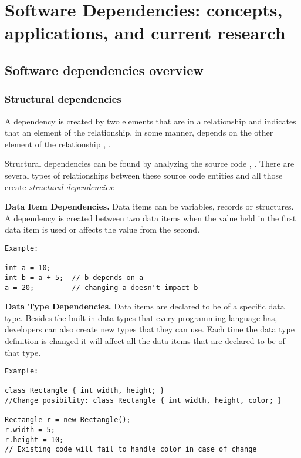 
\chapter{Software Dependencies: concepts, applications, and current research}
\label{dep}

\section{Software dependencies overview}

\subsection{Structural dependencies}
\hspace{4em} A dependency is created by two elements that are in a relationship and indicates that an element of the relationship, in some manner, depends on the other element of the relationship \cite{Booch:2004:OAD:975416}, \cite{Cataldo2009SoftwareDW}.

Structural dependencies can be found by analyzing the source code \cite{Sangal:2005:UDM:1094811.1094824}, \cite{CalloArias2011}. 
There are several types of relationships between these source code entities and all those create \textit{structural dependencies}:

\textbf{Data Item Dependencies.}
Data items can be variables, records or structures. A dependency is created between two data items when the value held in the first data item is used or affects the value from the second.


\begin{verbatim}
Example:

int a = 10;
int b = a + 5;  // b depends on a
a = 20;         // changing a doesn't impact b
\end{verbatim}

\textbf{Data Type Dependencies.}
Data items are declared to be of a specific data type. Besides the built-in data types that every programming language has, developers can also create new types that they can use. Each time the data type definition is changed it will affect all the data items that are declared to be of that type. 


\begin{verbatim}
Example:

class Rectangle { int width, height; }
//Change posibility: class Rectangle { int width, height, color; }

Rectangle r = new Rectangle();  
r.width = 5;
r.height = 10;
// Existing code will fail to handle color in case of change
\end{verbatim}

